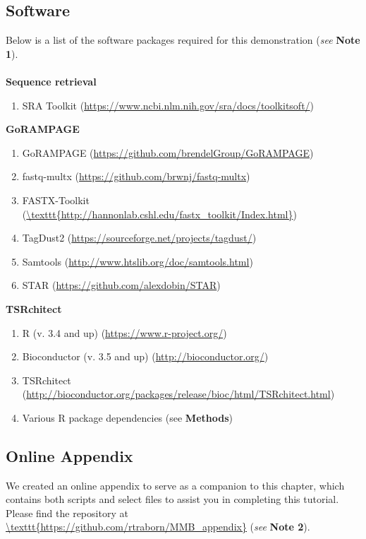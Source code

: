 \documentclass[runningheads,a4paper]{llncs}
\begin{document}
\begin{linenumbers}
\subsection{Software}
Below is a list of the software packages required for this demonstration (\textit{see} \textbf{Note 1}).\\
\\
\textbf{Sequence retrieval}
\begin{enumerate}
\item SRA Toolkit \cite{Leinonen:2011iw}  (\url{https://www.ncbi.nlm.nih.gov/sra/docs/toolkitsoft/})
\end{enumerate}
\textbf{GoRAMPAGE}
\begin{enumerate}
\item GoRAMPAGE \cite{Brendel:2016ab} (\url{https://github.com/brendelGroup/GoRAMPAGE})
\item fastq-multx \cite{Aronesty:2013gt} (\url{https://github.com/brwnj/fastq-multx})
\item FASTX-Toolkit \cite{citeulike:9103573} (\url{\texttt{http://hannonlab.cshl.edu/fastx\_toolkit/Index.html}})
\item TagDust2 \cite{Lassmann:2015gs} (\url{https://sourceforge.net/projects/tagdust/})
\item Samtools \cite{Li:2009ka} (\url{http://www.htslib.org/doc/samtools.html})
\item STAR \cite{Dobin:2016kq} (\url{https://github.com/alexdobin/STAR})
\end{enumerate}
\textbf{TSRchitect}
\begin{enumerate}
\item R (v. 3.4 and up) \cite{RCore:2017ab} (\url{https://www.r-project.org/})
\item Bioconductor (v. 3.5 and up) \cite{Lawrence:2014gy} (\url{http://bioconductor.org/})
\item TSRchitect \cite{Raborn:2017ab} (\url{http://bioconductor.org/packages/release/bioc/html/TSRchitect.html})
\item Various R package dependencies (see \textbf{Methods})
\end{enumerate}

\subsection{Online Appendix}
We created an online appendix to serve as a companion to this chapter, which contains both scripts and select files to assist you in completing this tutorial.
Please find the repository at \url{\texttt{https://github.com/rtraborn/MMB\_appendix}} (\textit{see} \textbf{Note 2}).


\end{linenumbers}
\end{document}
